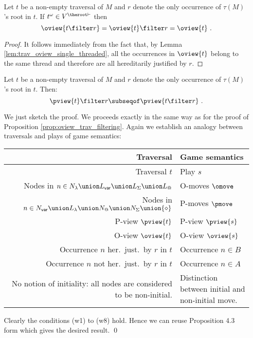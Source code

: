 \begin{corollary}
\label{cor:trav_filtering}
Let $t$ be a non-empty traversal of $M$ and $r$ denote the only occurrence of $\tau(M)$'s
root in $t$. If $t^\omega \in V^{\theroot\vdash}$ then $$\oview{t\filter r} = \oview{t}\filter r = \oview{t} \ .$$
\end{corollary}
\begin{proof}
It follows immediately from the fact that, by Lemma \ref{lem:trav_oview_single_threaded}, all the occurrences in $\oview{t}$ belong to the same thread and therefore are all hereditarily justified by $r$.
\end{proof}


\begin{lemma}
\label{lem:trav_pview_red}
Let $t$ be a non-empty traversal of $M$ and $r$ denote the only occurrence of $\tau(M)$'s
root in $t$. Then:
$$ \pview{t} \filter r \subseqof \pview{t \filter r} \  .$$
\end{lemma}
\proof
We just sketch the proof. We proceeds exactly in the same way as for the proof of Proposition \ref{prop:oview_trav_filtering}.  Again we establish an analogy between traversals and plays of game semantics:
\begin{center}
\begin{tabular}{r|p{5cm}}
{Traversal} & {Game semantics} \\
\hline
Traversal $t$ & Play $s$ \\
Nodes in $n \in N_\lambda \union L_{\sf var} \union L_\Sigma \union L_@$ & O-moves $\omove$ \\
Nodes in $n \in N_{\sf var} \union L_\lambda \union N_@ \union N_\Sigma \union \{\diamond\}$ & P-moves $\pmove$\\
P-view $\pview{t}$  & P-view $\pview{s}$\\
O-view $\oview{t}$  & O-view $\oview{s}$\\
Occurrence $n$ her.\ just.\ by $r$ in $t$ & Occurrence $n \in B$ \\
Occurrence $n$ not her.\ just.\ by $r$ in $t$ & Occurrence $n \in A$ \\
\parbox[t]{6cm}{\raggedleft No notion of initiality: all nodes are considered to be non-initial.} & Distinction between initial and non-initial move.
\end{tabular}
\end{center}
Clearly the conditions (w1) to (w8) hold. Hence we can reuse Proposition 4.3 form \cite{hylandong_pcf} which gives the desired result. \qed
\bigskip

